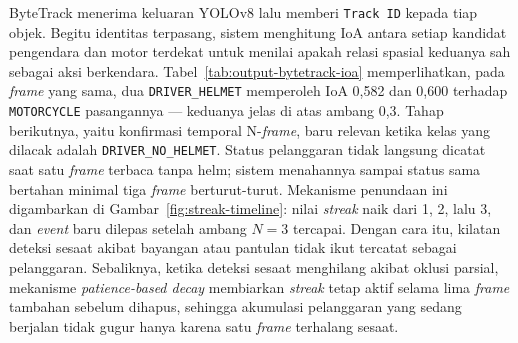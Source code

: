 ByteTrack menerima keluaran YOLOv8 lalu memberi \texttt{Track ID} kepada tiap objek. Begitu identitas terpasang, sistem menghitung IoA antara setiap kandidat pengendara dan motor terdekat untuk menilai apakah relasi spasial keduanya sah sebagai aksi berkendara. Tabel~\ref{tab:output-bytetrack-ioa} memperlihatkan, pada \textit{frame} yang sama, dua \texttt{DRIVER\_HELMET} memperoleh IoA 0,582 dan 0,600 terhadap \texttt{MOTORCYCLE} pasangannya --- keduanya jelas di atas ambang 0,3. Tahap berikutnya, yaitu konfirmasi temporal N-\textit{frame}, baru relevan ketika kelas yang dilacak adalah \texttt{DRIVER\_NO\_HELMET}. Status pelanggaran tidak langsung dicatat saat satu \textit{frame} terbaca tanpa helm; sistem menahannya sampai status sama bertahan minimal tiga \textit{frame} berturut-turut. Mekanisme penundaan ini digambarkan di Gambar~\ref{fig:streak-timeline}: nilai \textit{streak} naik dari 1, 2, lalu 3, dan \textit{event} baru dilepas setelah ambang $N=3$ tercapai. Dengan cara itu, kilatan deteksi sesaat akibat bayangan atau pantulan tidak ikut tercatat sebagai pelanggaran. Sebaliknya, ketika deteksi sesaat menghilang akibat oklusi parsial, mekanisme \textit{patience-based decay} membiarkan \textit{streak} tetap aktif selama lima \textit{frame} tambahan sebelum dihapus, sehingga akumulasi pelanggaran yang sedang berjalan tidak gugur hanya karena satu \textit{frame} terhalang sesaat.

\begin{table}[htbp]
\centering
\caption{Cuplikan keluaran ByteTrack dan perhitungan IoA pada \textit{frame} awal. Tiap objek memperoleh identitas persisten dan asosiasi spasialnya tervalidasi.}
\label{tab:output-bytetrack-ioa}
\small
{}
\end{table}

